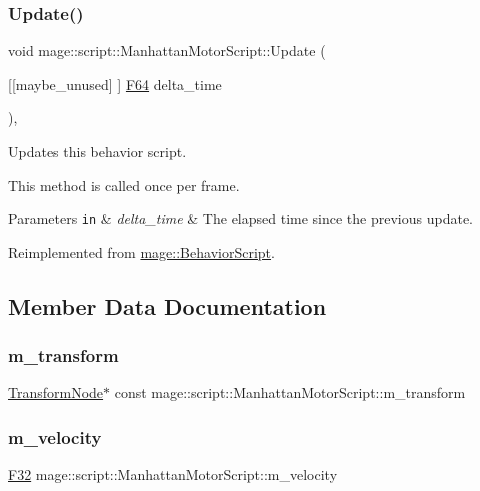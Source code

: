 \subsubsection{\texorpdfstring{Update()}{Update()}}
{\footnotesize\ttfamily void mage\+::script\+::\+Manhattan\+Motor\+Script\+::\+Update (\begin{DoxyParamCaption}\item[{\mbox{[}\mbox{[}maybe\+\_\+unused\mbox{]} \mbox{]} \hyperlink{namespacemage_ad26233bbec640deda836e572c1a23708}{F64}}]{delta\+\_\+time }\end{DoxyParamCaption})\hspace{0.3cm}{\ttfamily [override]}, {\ttfamily [virtual]}}

Updates this behavior script.

This method is called once per frame.


\begin{DoxyParams}[1]{Parameters}
\mbox{\tt in}  & {\em delta\+\_\+time} & The elapsed time since the previous update. \\
\hline
\end{DoxyParams}


Reimplemented from \hyperlink{classmage_1_1_behavior_script_afb9cf3759edf8876416d1df85489cba6}{mage\+::\+Behavior\+Script}.



\subsection{Member Data Documentation}
\hypertarget{classmage_1_1script_1_1_manhattan_motor_script_a4df5fa9ddd41dc83bdc7f2ee5d133fa9}{}\label{classmage_1_1script_1_1_manhattan_motor_script_a4df5fa9ddd41dc83bdc7f2ee5d133fa9} 
\subsubsection{\texorpdfstring{m\+\_\+transform}{m\_transform}}
{\footnotesize\ttfamily \hyperlink{classmage_1_1_transform_node}{Transform\+Node}$\ast$ const mage\+::script\+::\+Manhattan\+Motor\+Script\+::m\+\_\+transform\hspace{0.3cm}{\ttfamily [private]}}

\hypertarget{classmage_1_1script_1_1_manhattan_motor_script_a38cdef10269075f08f3fcdc9ed8bc520}{}\label{classmage_1_1script_1_1_manhattan_motor_script_a38cdef10269075f08f3fcdc9ed8bc520} 
\subsubsection{\texorpdfstring{m\+\_\+velocity}{m\_velocity}}
{\footnotesize\ttfamily \hyperlink{namespacemage_aa97e833b45f06d60a0a9c4fc22ae02c0}{F32} mage\+::script\+::\+Manhattan\+Motor\+Script\+::m\+\_\+velocity\hspace{0.3cm}{\ttfamily [private]}}


